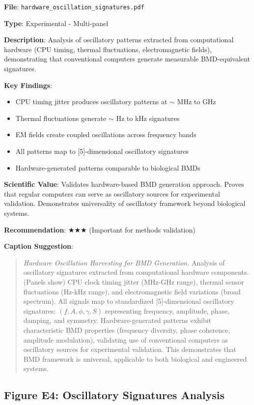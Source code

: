 \documentclass[11pt]{article}
\begin{document}
\textbf{File}: \texttt{hardware\_oscillation\_signatures.pdf}

\textbf{Type}: Experimental - Multi-panel

\textbf{Description}:
Analysis of oscillatory patterns extracted from computational hardware (CPU timing, thermal fluctuations, electromagnetic fields), demonstrating that conventional computers generate measurable BMD-equivalent signatures.

\textbf{Key Findings}:
\begin{itemize}
\item CPU timing jitter produces oscillatory patterns at $\sim$ MHz to GHz
\item Thermal fluctuations generate $\sim$ Hz to kHz signatures
\item EM fields create coupled oscillations across frequency bands
\item All patterns map to [5]-dimensional oscillatory signatures
\item Hardware-generated patterns comparable to biological BMDs
\end{itemize}

\textbf{Scientific Value}:
Validates hardware-based BMD generation approach. Proves that regular computers can serve as oscillatory sources for experimental validation. Demonstrates universality of oscillatory framework beyond biological systems.

\textbf{Recommendation}: $\bigstar\bigstar\bigstar$ (Important for methods validation)

\textbf{Caption Suggestion}:
\begin{quote}
\textit{Hardware Oscillation Harvesting for BMD Generation.} Analysis of oscillatory signatures extracted from computational hardware components. (Panels show) CPU clock timing jitter (MHz-GHz range), thermal sensor fluctuations (Hz-kHz range), and electromagnetic field variations (broad spectrum). All signals map to standardized [5]-dimensional oscillatory signatures: $(f, A, \phi, \gamma, S)$ representing frequency, amplitude, phase, damping, and symmetry. Hardware-generated patterns exhibit characteristic BMD properties (frequency diversity, phase coherence, amplitude modulation), validating use of conventional computers as oscillatory sources for experimental validation. This demonstrates that BMD framework is universal, applicable to both biological and engineered systems.
\end{quote}

\subsection{Figure E4: Oscillatory Signatures Analysis}
\end{document}

